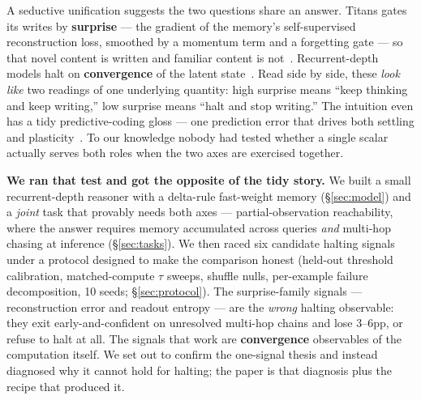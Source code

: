 \documentclass{article}
\begin{document}
A seductive unification suggests the two questions share an answer. Titans
gates its writes by \textbf{surprise} --- the gradient of the memory's
self-supervised reconstruction loss, smoothed by a momentum term and a
forgetting gate --- so that novel content is written and familiar content
is not~\citep{behrouz2025titans}. Recurrent-depth models halt on
\textbf{convergence} of the latent state~\citep{geiping2025recurrent}. Read
side by side, these \emph{look like} two readings of one underlying quantity:
high surprise means ``keep thinking and keep writing,'' low surprise means
``halt and stop writing.'' The intuition even has a tidy predictive-coding
gloss --- one prediction error that drives both settling and
plasticity~\citep{rao1999predictive,friston2010free}. To our knowledge nobody
had tested whether a single scalar actually serves both roles when the two axes
are exercised together.

\textbf{We ran that test and got the opposite of the tidy story.} We built a
small recurrent-depth reasoner with a delta-rule fast-weight memory
(\S\ref{sec:model}) and a \emph{joint} task that provably needs both axes ---
partial-observation reachability, where the answer requires memory accumulated
across queries \emph{and} multi-hop chasing at inference (\S\ref{sec:tasks}).
We then raced six candidate halting signals under a protocol designed to make
the comparison honest (held-out threshold calibration, matched-compute $\tau$
sweeps, shuffle nulls, per-example failure decomposition, 10 seeds;
\S\ref{sec:protocol}). The surprise-family signals --- reconstruction error and
readout entropy --- are the \emph{wrong} halting observable: they exit
early-and-confident on unresolved multi-hop chains and lose 3--6pp, or refuse
to halt at all. The signals that work are \textbf{convergence} observables of
the computation itself. We set out to confirm the one-signal thesis and instead
diagnosed why it cannot hold for halting; the paper is that diagnosis plus the
recipe that produced it.
\end{document}
